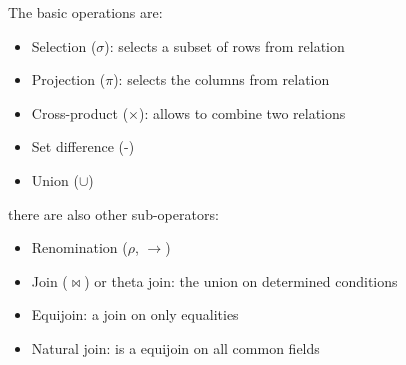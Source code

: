 \documentclass[12pt, a4paper]{article}
\begin{document}
The basic operations are:
\begin{itemize}
    \item Selection ($\sigma$): selects a subset of rows from relation 
    \item Projection ($\pi$): selects the columns from relation
    \item Cross-product ($\times$): allows to combine two relations
    \item Set difference (-) 
    \item Union ($\cup$)
\end{itemize}
there are also other sub-operators:
\begin{itemize}
    \item Renomination ($\rho$, $\rightarrow$)
    \item Join ($\Join$) or theta join: the union on determined conditions
    \item Equijoin: a join on only equalities
    \item Natural join: is a equijoin on all common fields
\end{itemize}
\end{document}
